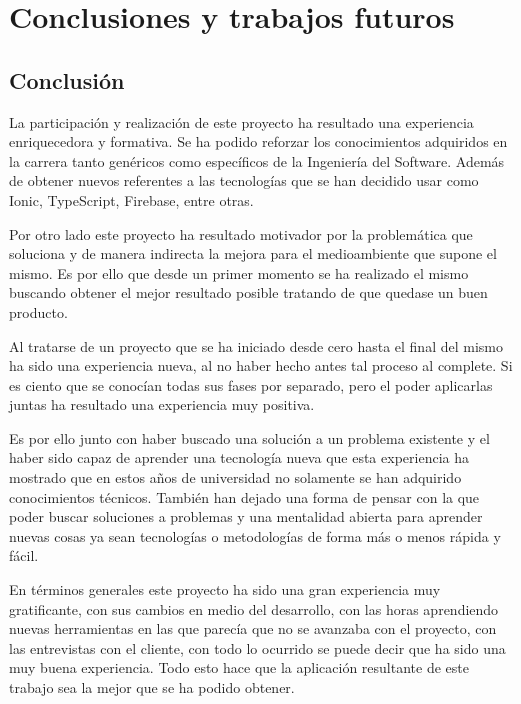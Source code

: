 \section{Conclusiones y trabajos futuros}
\subsection{Conclusión}
La participación y realización de este proyecto ha resultado una
experiencia enriquecedora y formativa. Se ha podido reforzar los
conocimientos adquiridos en la carrera tanto genéricos como específicos
de la Ingeniería del Software. Además de obtener nuevos referentes a
las tecnologías que se han decidido usar como Ionic, TypeScript, Firebase,
entre otras.

\medskip
Por otro lado este proyecto ha resultado motivador por la problemática
que soluciona y de manera indirecta la mejora para el medioambiente
que supone el mismo. Es por ello que desde un primer momento se ha
realizado el mismo buscando obtener el mejor resultado posible tratando
de que quedase un buen producto.

\medskip
Al tratarse de un proyecto que se ha iniciado desde cero hasta el final
del mismo ha sido una experiencia nueva, al no haber hecho antes
tal proceso al complete. Si es ciento que se conocían todas sus
fases por separado, pero el poder aplicarlas juntas ha resultado
una experiencia muy positiva.

\medskip
Es por ello junto con haber buscado una solución a un problema
existente y el haber sido capaz de aprender una tecnología nueva
que esta experiencia ha mostrado que en estos años de universidad
no solamente se han adquirido conocimientos técnicos. También han
dejado una forma de pensar con la que poder buscar soluciones a
problemas y una mentalidad abierta para aprender nuevas cosas
ya sean tecnologías o metodologías de forma más o menos rápida y
fácil.

\medskip
En términos generales este proyecto ha sido una gran experiencia
muy gratificante, con sus cambios en medio del desarrollo, con
las horas aprendiendo nuevas herramientas en las que parecía que
no se avanzaba con el proyecto, con las entrevistas
con el cliente, con todo lo ocurrido se puede decir que ha sido
una muy buena experiencia. Todo esto hace que la aplicación
resultante de este trabajo sea la mejor que se ha podido obtener.

